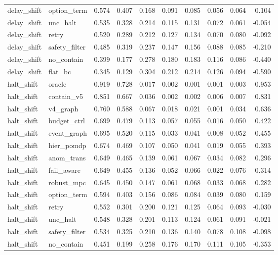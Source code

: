 \documentclass{article}
\begin{document}
\begin{longtable}{@{}llrrrrrrrr@{}}
delay\_shift & option\_term & 0.574 & 0.407 & 0.168 & 0.091 & 0.085 & 0.056 & 0.064 & 0.104 \\
delay\_shift & unc\_halt & 0.535 & 0.328 & 0.214 & 0.115 & 0.131 & 0.072 & 0.061 & -0.054 \\
delay\_shift & retry & 0.520 & 0.289 & 0.212 & 0.127 & 0.134 & 0.070 & 0.080 & -0.092 \\
delay\_shift & safety\_filter & 0.485 & 0.319 & 0.237 & 0.147 & 0.156 & 0.088 & 0.085 & -0.210 \\
delay\_shift & no\_contain & 0.399 & 0.177 & 0.278 & 0.180 & 0.183 & 0.116 & 0.086 & -0.440 \\
delay\_shift & flat\_bc & 0.345 & 0.129 & 0.304 & 0.212 & 0.214 & 0.126 & 0.094 & -0.590 \\
halt\_shift & oracle & 0.919 & 0.728 & 0.017 & 0.002 & 0.001 & 0.001 & 0.003 & 0.953 \\
halt\_shift & contain\_v5 & 0.851 & 0.667 & 0.036 & 0.002 & 0.002 & 0.006 & 0.007 & 0.831 \\
halt\_shift & v4\_graph & 0.760 & 0.588 & 0.067 & 0.018 & 0.021 & 0.001 & 0.034 & 0.636 \\
halt\_shift & budget\_ctrl & 0.699 & 0.479 & 0.113 & 0.057 & 0.055 & 0.016 & 0.050 & 0.422 \\
halt\_shift & event\_graph & 0.695 & 0.520 & 0.115 & 0.033 & 0.041 & 0.008 & 0.052 & 0.455 \\
halt\_shift & hier\_pomdp & 0.674 & 0.469 & 0.107 & 0.050 & 0.041 & 0.019 & 0.055 & 0.393 \\
halt\_shift & anom\_trans & 0.649 & 0.465 & 0.139 & 0.061 & 0.067 & 0.034 & 0.082 & 0.296 \\
halt\_shift & fail\_aware & 0.649 & 0.455 & 0.136 & 0.052 & 0.066 & 0.022 & 0.076 & 0.314 \\
halt\_shift & robust\_mpc & 0.645 & 0.450 & 0.147 & 0.061 & 0.068 & 0.033 & 0.068 & 0.282 \\
halt\_shift & option\_term & 0.594 & 0.403 & 0.156 & 0.086 & 0.084 & 0.039 & 0.080 & 0.159 \\
halt\_shift & retry & 0.552 & 0.301 & 0.200 & 0.121 & 0.125 & 0.064 & 0.093 & -0.030 \\
halt\_shift & unc\_halt & 0.548 & 0.328 & 0.201 & 0.113 & 0.124 & 0.061 & 0.091 & -0.021 \\
halt\_shift & safety\_filter & 0.534 & 0.325 & 0.210 & 0.136 & 0.140 & 0.078 & 0.108 & -0.098 \\
halt\_shift & no\_contain & 0.451 & 0.199 & 0.258 & 0.176 & 0.170 & 0.111 & 0.105 & -0.353 \\

\end{longtable}
\end{document}
